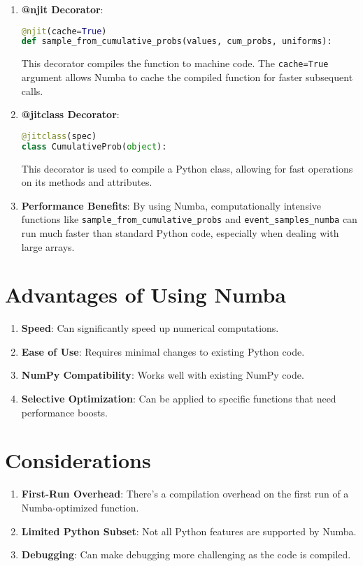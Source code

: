 \documentclass{article}
\begin{document}
\begin{enumerate}
    \item \textbf{@njit Decorator}: 
    \begin{lstlisting}[language=Python]
@njit(cache=True)
def sample_from_cumulative_probs(values, cum_probs, uniforms):
    \end{lstlisting}
    This decorator compiles the function to machine code. The \texttt{cache=True} argument allows Numba to cache the compiled function for faster subsequent calls.

    \item \textbf{@jitclass Decorator}:
    \begin{lstlisting}[language=Python]
@jitclass(spec)
class CumulativeProb(object):
    \end{lstlisting}
    This decorator is used to compile a Python class, allowing for fast operations on its methods and attributes.

    \item \textbf{Performance Benefits}: By using Numba, computationally intensive functions like \texttt{sample\_from\_cumulative\_probs} and \texttt{event\_samples\_numba} can run much faster than standard Python code, especially when dealing with large arrays.
\end{enumerate}

\section{Advantages of Using Numba}

\begin{enumerate}
    \item \textbf{Speed}: Can significantly speed up numerical computations.
    \item \textbf{Ease of Use}: Requires minimal changes to existing Python code.
    \item \textbf{NumPy Compatibility}: Works well with existing NumPy code.
    \item \textbf{Selective Optimization}: Can be applied to specific functions that need performance boosts.
\end{enumerate}

\section{Considerations}

\begin{enumerate}
    \item \textbf{First-Run Overhead}: There's a compilation overhead on the first run of a Numba-optimized function.
    \item \textbf{Limited Python Subset}: Not all Python features are supported by Numba.
    \item \textbf{Debugging}: Can make debugging more challenging as the code is compiled.
\end{enumerate}
\end{document}

